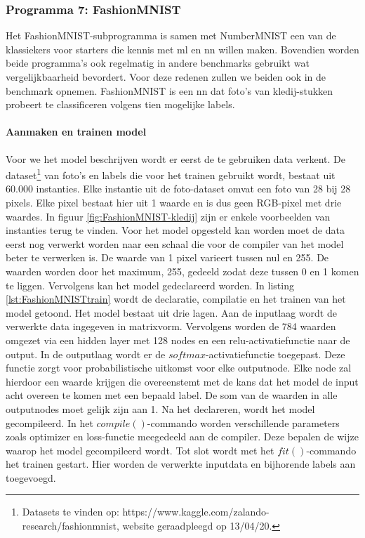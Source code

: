 		\subsubsection{Programma 7: FashionMNIST}
		Het FashionMNIST-subprogramma is samen met NumberMNIST een van de klassiekers voor starters die kennis met \gls{ml} en \gls{nn} willen maken. Bovendien worden beide programma's ook regelmatig in andere benchmarks gebruikt wat vergelijkbaarheid bevordert. Voor deze redenen zullen we beiden ook in de benchmark opnemen. FashionMNIST is een \gls{nn} dat foto's van kledij-stukken probeert te classificeren volgens tien mogelijke labels. 
		
			\paragraph{Aanmaken en trainen model}
			
			
			Voor we het model beschrijven wordt er eerst de te gebruiken data verkent. De dataset\footnote{Datasets te vinden op: https://www.kaggle.com/zalando-research/fashionmnist, website geraadpleegd op 13/04/20.} van foto's en labels die voor het trainen gebruikt wordt, bestaat uit 60.000 instanties. Elke instantie uit de foto-dataset omvat een foto van 28 bij 28 pixels. Elke pixel bestaat hier uit 1 waarde en is dus geen RGB-pixel met drie waardes. In figuur \ref{fig:FashionMNIST-kledij} zijn er enkele voorbeelden van instanties terug te vinden. Voor het model opgesteld kan worden moet de data eerst nog verwerkt worden naar een schaal die voor de compiler van het model beter te verwerken is. De waarde van 1 pixel varieert tussen nul en 255. De waarden worden door het maximum, 255, gedeeld zodat deze tussen 0 en 1 komen te liggen. Vervolgens kan het model gedeclareerd worden. In listing \ref{lst:FashionMNISTtrain} wordt de declaratie, compilatie en het trainen van het model getoond. Het model bestaat uit drie lagen. Aan de inputlaag wordt de verwerkte data ingegeven in matrixvorm. Vervolgens worden de 784 waarden omgezet via een hidden layer met 128 nodes en een relu-activatiefunctie naar de output. In de outputlaag wordt er de $softmax$-activatiefunctie toegepast. Deze functie zorgt voor probabilistische uitkomst voor elke outputnode. Elke node zal hierdoor een waarde krijgen die overeenstemt met de kans dat het model de input acht overeen te komen met een bepaald label. De som van de waarden in alle outputnodes moet gelijk zijn aan 1. Na het declareren, wordt het model gecompileerd. In het $compile()$-commando worden verschillende parameters zoals optimizer en loss-functie meegedeeld aan de compiler. Deze bepalen de wijze waarop het model gecompileerd wordt. Tot slot wordt met het $fit()$-commando het trainen gestart. Hier worden de verwerkte inputdata en bijhorende labels aan toegevoegd.  
			

